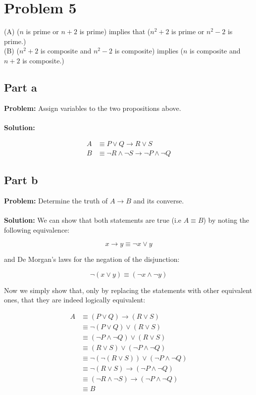 \documentclass{article}
\begin{document}
\section{Problem 5}
(A) ($n$ is prime or $n+2$ is prime) implies that ($n^2+2$ is prime or $n^2-2$ is prime.)\\
(B) ($n^2+2$ is composite and $n^2-2$ is composite) implies ($n$ is composite and $n+2$ is composite.)
\subsection{Part a}
\textbf{Problem:} Assign variables to the two propositions above.
\\\\
\textbf{Solution:}

\begin{align*}
A&\equiv P\vee Q\rightarrow R\vee S\\
B&\equiv \neg R\wedge \neg S\rightarrow \neg P\wedge \neg Q
\end{align*}

\subsection{Part b}
\textbf{Problem:} Determine the truth of $A\rightarrow B$ and its converse.
\\\\
\textbf{Solution:} We can show that both statements are true (i.e $A\equiv B$) by noting the following equivalence:

$$x\rightarrow y\equiv \neg x\vee y$$

and De Morgan's laws for the negation of the disjunction:

$$\neg(x\vee y)\equiv (\neg x\wedge \neg y)$$

Now we simply show that, only by replacing the statements with other equivalent ones, that they are indeed logically equivalent:

\begin{align*}
  A&\equiv(P\vee Q)\rightarrow (R\vee S)\\
  &\equiv\neg (P\vee Q)\vee (R\vee S) \tag{1st equivalence}\\
  &\equiv(\neg P\wedge\neg Q)\vee (R\vee S) \tag{De Morgan's law}\\
  &\equiv(R\vee S)\vee (\neg P\wedge\neg Q) \tag{Symmetry of disjunction}\\
  &\equiv\neg(\neg(R\vee S))\vee (\neg P\wedge\neg Q) \tag{Double negation}\\
  &\equiv\neg(R\vee S)\rightarrow (\neg P\wedge\neg Q) \tag{1st equivalence}\\
  &\equiv(\neg R\wedge\neg S)\rightarrow (\neg P\wedge\neg Q) \tag{De Morgan's law}\\
  &\equiv B
\end{align*}
\end{document}
